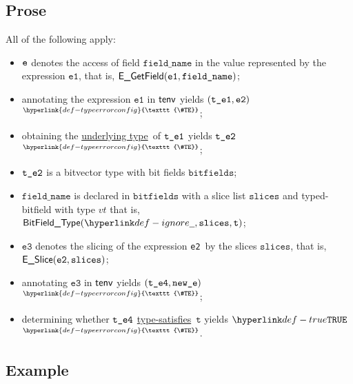 \documentclass{book}
\newcommand\TypeErrorConfig[0]{\hyperlink{def-typeerrorconfig}{\texttt{\#TE}}}
\newcommand\ProseOrTypeError[0]{\hyperlink{def-proseortypeerror}{$^{\TypeErrorConfig}$}}
\newcommand\underlyingtype[0]{\hyperlink{def-underlyingtype}{underlying type}}
\newcommand\typesatisfies[0]{\hyperlink{def-typesatisfies}{type-satisfies}}
\newcommand\vt[0]{\texttt{t}}
\newcommand\veone[0]{\texttt{e1}}
\newcommand\vetwo[0]{\texttt{e2}}
\newcommand\vethree[0]{\texttt{e3}}
\newcommand\bitfields[0]{\texttt{bitfields}}
\newcommand\fieldname[0]{\texttt{field\_name}}
\newcommand\slices[0]{\texttt{slices}}
\newcommand\newe[0]{\texttt{new\_e}}
\begin{document}
\subsection{Prose}
All of the following apply:
\begin{itemize}
  \item $\texttt{e}$ denotes the access of field $\fieldname$ in the value represented by the expression $\veone$, that is, $\EGetField(\veone, \fieldname)$;
  \item annotating the expression $\veone$ in $\textsf{tenv}$ yields $(\vteone, \vetwo)$ \ProseOrTypeError;
  \item obtaining the \underlyingtype\ of $\texttt{t\_e1}$ yields $\texttt{t\_e2}$ \ProseOrTypeError;
  \item $\texttt{t\_e2}$ is a bitvector type with bit fields $\bitfields$;
  \item $\fieldname$ is declared in $\bitfields$ with a slice list $\slices$ and typed-bitfield with type $vt$ that is,
        $\BitFieldType(\Ignore, \slices, \vt)$;
  \item $\vethree$ denotes the slicing of the expression \vetwo\ by the slices $\slices$, that is, \\ $\ESlice(\vetwo, \slices)$;
  \item annotating $\vethree$ in $\textsf{tenv}$ yields $(\vtefour, \newe)$ \ProseOrTypeError;
  \item determining whether $\texttt{t\_e4}$ \typesatisfies\ $\vt$ yields $\True$ \ProseOrTypeError.
\end{itemize}

\subsection{Example}

\end{document}

